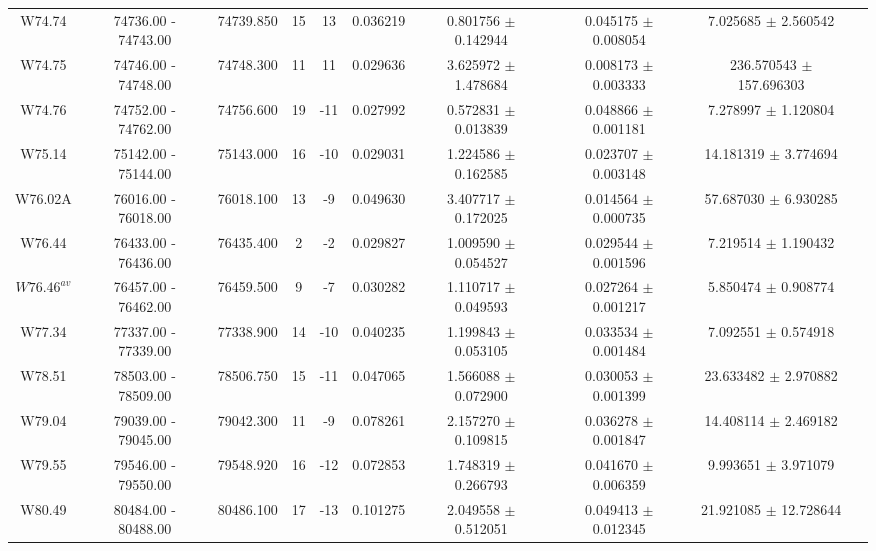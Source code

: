 \documentclass{article}
\begin{document}
\begin{table}[h]
{\begin{tabular}{|c|c|c|c|c|c|c|c|c|c|}
W74.74 & 74736.00 - 74743.00 & 74739.850 & 15 & 13 & 0.036219 & 0.801756 $\pm$ 0.142944 & 0.045175 $\pm$ 0.008054 & 7.025685 $\pm$ 2.560542 \\

W74.75 & 74746.00 - 74748.00 & 74748.300 & 11 & 11 & 0.029636 & 3.625972 $\pm$ 1.478684 & 0.008173 $\pm$ 0.003333 & 236.570543 $\pm$ 157.696303 \\

W74.76 & 74752.00 - 74762.00 & 74756.600 & 19 & -11 & 0.027992 & 0.572831 $\pm$ 0.013839 & 0.048866 $\pm$ 0.001181 & 7.278997 $\pm$ 1.120804 \\

W75.14 & 75142.00 - 75144.00 & 75143.000 & 16 & -10 & 0.029031 & 1.224586 $\pm$ 0.162585 & 0.023707 $\pm$ 0.003148 & 14.181319 $\pm$ 3.774694 \\
        
W76.02A & 76016.00 - 76018.00 & 76018.100 & 13 & -9 & 0.049630 & 3.407717 $\pm$ 0.172025 & 0.014564 $\pm$ 0.000735 & 57.687030 $\pm$ 6.930285 \\

W76.44 & 76433.00 - 76436.00 & 76435.400 & 2 & -2 & 0.029827 & 1.009590 $\pm$ 0.054527 & 0.029544 $\pm$ 0.001596 & 7.219514 $\pm$ 1.190432 \\
    
$W76.46^{av}$ & 76457.00 - 76462.00 & 76459.500 & 9 & -7 & 0.030282 & 1.110717 $\pm$ 0.049593 & 0.027264 $\pm$ 0.001217 & 5.850474 $\pm$ 0.908774 \\
         
W77.34 & 77337.00 - 77339.00 & 77338.900 & 14 & -10 & 0.040235 & 1.199843 $\pm$ 0.053105 & 0.033534 $\pm$ 0.001484 & 7.092551 $\pm$ 0.574918 \\

W78.51 & 78503.00 - 78509.00 & 78506.750 & 15 & -11 & 0.047065 & 1.566088 $\pm$ 0.072900 & 0.030053 $\pm$ 0.001399 & 23.633482 $\pm$ 2.970882 \\

W79.04 & 79039.00 - 79045.00 & 79042.300 & 11 & -9 & 0.078261 & 2.157270 $\pm$ 0.109815 & 0.036278 $\pm$ 0.001847 & 14.408114 $\pm$ 2.469182 \\
         
W79.55 & 79546.00 - 79550.00 & 79548.920 & 16 & -12 & 0.072853 & 1.748319 $\pm$ 0.266793 &  0.041670 $\pm$ 0.006359 & 9.993651 $\pm$ 3.971079 \\
         
W80.49 & 80484.00 - 80488.00 & 80486.100 & 17 & -13 & 0.101275 & 2.049558 $\pm$ 0.512051 & 0.049413 $\pm$ 0.012345 & 21.921085 $\pm$ 12.728644 \\


\end{tabular}}
\end{table}
\end{document}
